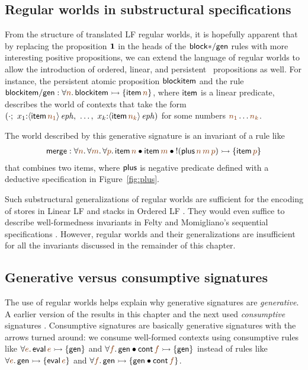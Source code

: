 \subsection{Regular worlds in substructural specifications}

From the structure of translated LF regular worlds, it is hopefully
apparent that by replacing the proposition $\mathbf{1}$ in the heads of the
${\sf block{*}/gen}$ rules with more interesting positive
\sls propositions,  we can extend the language of regular
worlds to allow the introduction of ordered, linear, and persistent
\sls~propositions as well. For instance, the persistent atomic proposition
${\sf blockitem}$ and the rule
${\sf blockitem/gen} : 
\forall \lf{n}. \, {\sf blockitem} \lefti \{ {\sf item}\,\lf{n} \}$,
where ${\sf item}$ is a linear predicate,
describes the world of contexts that take the form
$\left(\cdot; ~ x_1{:}\iseph{\susp{{\sf item}\,\lf{n_1}}}, ~
         \ldots, ~
         x_k{:}\iseph{\susp{{\sf item}\,\lf{n_k}}}\right)$
for some numbers $\lf{n_1}\ldots\lf{n_k}$. 

The world described by this generative signature is an invariant of a
rule like
\begin{align*}
  {\sf merge} : 
  \forall \lf{n}.\,\forall\lf{m}.\,\forall\lf{p}.\,
   {\sf item}\,\lf{n} \fuse
   {\sf item}\,\lf{m} \fuse
   {!}({\sf plus}\,\lf{n}\,\lf{m}\,\lf{p}) 
    \lefti \{ {\sf item}\,\lf{p} \}
\end{align*}
that combines two items,
where ${\sf plus}$ is  negative predicate defined with a deductive
specification in 
Figure~\ref{fig:plus}.  

Such substructural generalizations of regular worlds are sufficient
for the encoding of stores in Linear LF \cite{cervesato02linear} and
stacks in Ordered LF \cite{polakow01ordered}. They would even suffice
to describe well-formedness invariants in Felty and Momigliano's
sequential specifications \cite{felty12hybrid}. However, regular
worlds and their generalizations are insufficient for all the
invariants discussed in the remainder of this chapter.

\subsection{Generative versus consumptive signatures}

The use of regular worlds helps explain why generative signatures are
{\it generative}. A earlier version of the results in this chapter and
the next used {\it consumptive} signatures
\cite{simmons10type}. Consumptive signatures are basically generative
signatures with the arrows turned around: we consume well-formed
contexts using consumptive rules like $\forall\lf{e}.\,{\sf
  eval}\,\lf{e} \lefti \{ {\sf gen} \}$ and $\forall \lf{f}.\,{\sf
  gen} \fuse {\sf cont}\,\lf{f} \lefti \{ {\sf gen} \}$ instead of
rules like $\forall\lf{e}.\,{\sf gen}\lefti \{ {\sf eval}\,\lf{e} \}$
and $\forall \lf{f}.\,{\sf gen} \lefti \{ {\sf gen} \fuse {\sf
  cont}\,\lf{f} \}$. 

